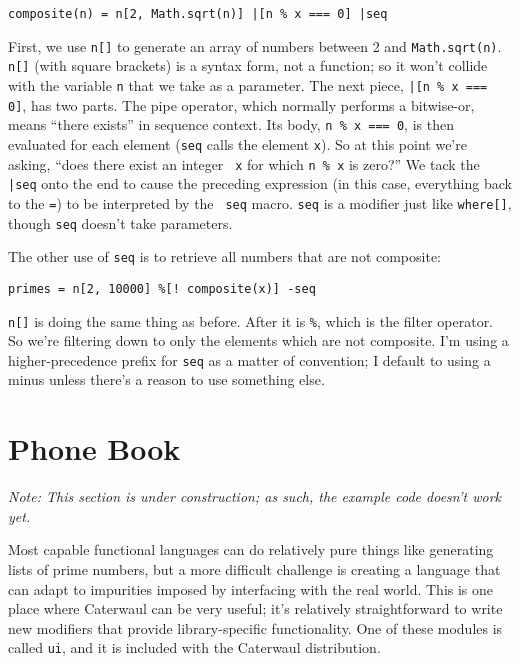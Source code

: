 \documentclass{report}
\begin{document}
\begin{verbatim}
composite(n) = n[2, Math.sqrt(n)] |[n % x === 0] |seq
\end{verbatim}

    First, we use {\tt n[]} to generate an array of numbers between 2 and {\tt Math.sqrt(n)}. {\tt n[]} (with square brackets) is a syntax form, not a function; so it won't collide with the
    variable {\tt n} that we take as a parameter. The next piece, \verb+|[n % x === 0]+, has two parts. The pipe operator, which normally performs a bitwise-or, means ``there exists'' in
    sequence context. Its body, \verb|n % x === 0|, is then evaluated for each element ({\tt seq} calls the element {\tt x}). So at this point we're asking, ``does there exist an integer {\tt
    x} for which {\tt n \% x} is zero?'' We tack the \verb+|seq+ onto the end to cause the preceding expression (in this case, everything back to the {\tt =}) to be interpreted by the {\tt
    seq} macro. {\tt seq} is a modifier just like {\tt where[]}, though {\tt seq} doesn't take parameters.

    The other use of {\tt seq} is to retrieve all numbers that are not composite:

\begin{verbatim}
primes = n[2, 10000] %[! composite(x)] -seq
\end{verbatim}

    {\tt n[]} is doing the same thing as before. After it is {\tt \%}, which is the filter operator. So we're filtering down to only the elements which are not composite. I'm using a
    higher-precedence prefix for {\tt seq} as a matter of convention; I default to using a minus unless there's a reason to use something else.

\chapter{Phone Book}\label{sec:phone-book}
  {\it Note: This section is under construction; as such, the example code doesn't work yet.}

  Most capable functional languages can do relatively pure things like generating lists of prime numbers, but a more difficult challenge is creating a language that can adapt to impurities
  imposed by interfacing with the real world. This is one place where Caterwaul can be very useful; it's relatively straightforward to write new modifiers that provide library-specific
  functionality. One of these modules is called {\tt ui}, and it is included with the Caterwaul distribution.
\end{document}
